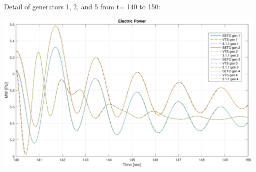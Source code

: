 \documentclass[12pt]{article}
\begin{document}
Detail of generators 1, 2, and 5 from t= 140 to 150:

\includegraphics[width=\linewidth]{verPelectDetail}
\end{document}
